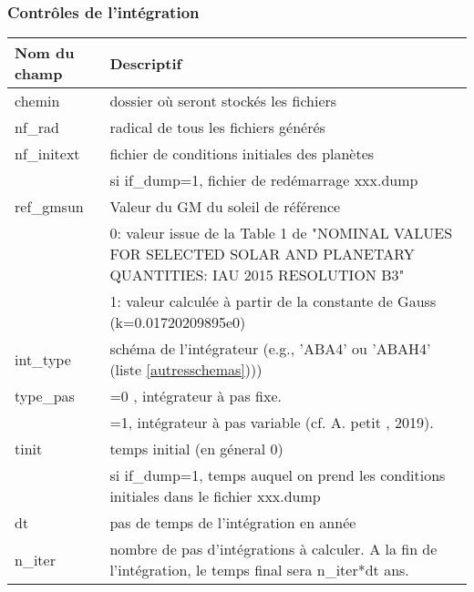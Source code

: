\documentclass[11pt]{article}
\begin{document}
\subsubsection*{Contr\^oles de l'int\'egration}

\begin{tabularx}{\textwidth}{|l|X|}
\hline
Nom du champ& Descriptif \\ \hline 
chemin   & dossier o\`u seront stock\'es les fichiers \\ \hline
 nf\_rad    & radical de tous les fichiers g\'en\'er\'es\\ \hline
 nf\_initext& fichier de conditions initiales des plan\`etes\\
 &si if\_dump=1, fichier de red\'emarrage xxx.dump \\ \hline

 ref\_gmsun& Valeur du GM du soleil de r\'ef\'erence \\ 
& 0: valeur issue de la Table 1 de "NOMINAL VALUES FOR SELECTED SOLAR AND PLANETARY QUANTITIES: IAU 2015 RESOLUTION B3"\\
& 1: valeur calculée à partir de la constante de Gauss (k=0.01720209895e0) \\\hline

 int\_type& sch\'ema de l'int\'egrateur (e.g., 'ABA4' ou 'ABAH4' (liste \ref{autresschemas}))) \\ \hline

 type\_pas & =0 , int\'egrateur \`a pas fixe.\\
&=1, int\'egrateur \`a pas variable (cf. A. petit , 2019).\\ \hline
 
 tinit & temps initial (en g\'eneral 0)\\
  &si if\_dump=1, temps auquel on prend les conditions initiales dans le fichier xxx.dump \\ \hline

 dt& pas de temps de l'int\'egration en ann\'ee \\ \hline

 n\_iter& nombre de pas d'int\'egrations \`a calculer. A la fin de l'int\'egration, le temps final sera  n\_iter*dt ans.\\ \hline


\end{tabularx}
\end{document}
